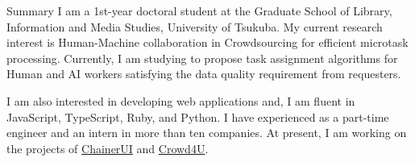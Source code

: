 \documentclass{resume} %
\begin{document}
\begin{rSection}{Summary}
I am a 1st-year doctoral student at the Graduate School of Library, Information and Media Studies, University of Tsukuba.
My current research interest is Human-Machine collaboration in Crowdsourcing for efficient microtask processing.
Currently, I am studying to propose task assignment algorithms for Human and AI workers satisfying the data quality requirement from requesters.
  
I am also interested in developing web applications and, I am fluent in JavaScript, TypeScript, Ruby, and Python.
I have experienced as a part-time engineer and an intern in more than ten companies.
At present, I am working on the projects of \href{https://github.com/chainer/chainerui}{ChainerUI} and \href{http://crowd4u.org}{Crowd4U}.
  


\end{rSection}

\end{document}

